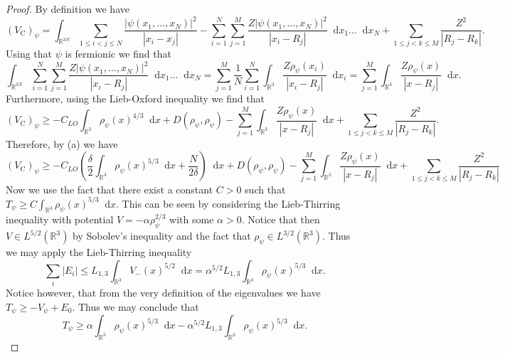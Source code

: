 \documentclass[a4paper,11pt]{article}
\newcommand{\abs}[1]{\left\lvert #1 \right\rvert}
\newcommand*\diff{\mathop{}\!\mathrm{d}}
\newcommand{\R}{\mathbb{R}}
\numberwithin{equation}{section}
\begin{document}
\begin{proof}
	By definition we have \begin{equation}
	(V_\text{C})_{\psi}=\int_{\R^{3N}}\sum_{1\leq i<j\leq N}\frac{\abs{\psi(x_1,...,x_N)}^2}{\abs{x_i-x_j}}-\sum_{i=1}^{N}\sum_{j=1}^{M}\frac{Z\abs{\psi(x_1,...,x_N)}^2}{\abs{x_i-R_j}}\diff x_1 ...\diff x_N+\sum_{1\leq j< k\leq M}\frac{Z^2}{\abs{R_j-R_k}}.
	\end{equation}
	Using that $ \psi $ is fermionic we find that \begin{equation}
	\int_{\R^{3N}}\sum_{i=1}^{N}\sum_{j=1}^{M}\frac{Z\abs{\psi(x_1,...,x_N)}^2}{\abs{x_i-R_j}}\diff x_1 ...\diff x_N=\sum_{j=1}^{M}\frac{1}{N}\sum_{i=1}^{N}\int_{\R^3}\frac{Z\rho_\psi(x_i)}{\abs{x_i-R_j}}\diff x_i=\sum_{j=1}^{M}\int_{\R^3}\frac{Z\rho_\psi(x)}{\abs{x-R_j}}\diff x.
	\end{equation}
	Furthermore, using the Lieb-Oxford inequality we find that \begin{equation}
	(V_{\text{C}})_{\psi}\geq -C_{LO}\int_{\R^3}\rho_{\psi}(x)^{4/3} \diff x+D(\rho_\psi,\rho_\psi)-\sum_{j=1}^{M}\int_{\R^3}\frac{Z\rho_\psi(x)}{\abs{x-R_j}}\diff x+\sum_{1\leq j< k\leq M}\frac{Z^2}{\abs{R_j-R_k}}.
	\end{equation}
	Therefore, by (a) we have \begin{equation}\label{CoulombEst1}
	(V_{\text{C}})_{\psi}\geq -C_{LO}\left(\frac{\delta}{2}\int_{\R^3}\rho_{\psi}(x)^{5/3}\diff x+\frac{N}{2\delta}\right) \diff x+D(\rho_\psi,\rho_\psi)-\sum_{j=1}^{M}\int_{\R^3}\frac{Z\rho_\psi(x)}{\abs{x-R_j}}\diff x+\sum_{1\leq j< k\leq M}\frac{Z^2}{\abs{R_j-R_k}}
	\end{equation}
	Now we use the fact that there exist a constant $ C>0 $ such that $ T_\psi\geq C\int_{\R^3}\rho_\psi(x)^{5/3}\diff x $. This can be seen by considering the Lieb-Thirring inequality with potential $ V=-\alpha\rho_\psi^{2/3} $ with some $ \alpha>0 $. Notice that then $ V\in L^{5/2}(\R^3) $ by Sobolev's inequality and the fact that $ \rho_\psi\in L^{3/2}(\R^3) $. Thus we may apply the Lieb-Thirring inequality \begin{equation}
	\sum_{i}\abs{E_i}\leq L_{1,3}\int_{\R^3}V_{-}(x)^{5/2}\diff x=\alpha^{5/2}L_{1,3}\int_{\R^3} \rho_\psi(x)^{5/3}\diff x.
	\end{equation}
	Notice however, that from the very definition of the eigenvalues we have $ T_\psi\geq -V_\psi+E_0 $. Thus we may conclude that \begin{equation}
	T_\psi\geq\alpha\int_{\R^3}\rho_\psi(x)^{5/3}\diff x-\alpha^{5/2}L_{1,3}\int_{\R^3}\rho_\psi(x)^{5/3}\diff x.

\end{equation}
\end{proof}
\end{document}
